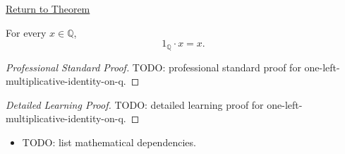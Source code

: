 \newpage
{}
\label{prf:one-left-multiplicative-identity-on-q}

\begin{remark*}[Return]
\hyperref[thm:one-left-multiplicative-identity-on-q]{Return to Theorem}
\end{remark*}

\begin{theorem*}
For every $x\in\mathbb{Q}$,
\[
1_{\mathbb{Q}}\cdot x=x.
\]
\end{theorem*}

\begin{proof}[Professional Standard Proof]
\LRAProofBodyStart
TODO: professional standard proof for one-left-multiplicative-identity-on-q.
\end{proof}

\begin{proof}[Detailed Learning Proof]
\LRAProofBodyStart
TODO: detailed learning proof for one-left-multiplicative-identity-on-q.
\end{proof}

\begin{remark*}
\end{remark*}

\begin{dependencies}
\begin{itemize}
  \item TODO: list mathematical dependencies.
\end{itemize}
\end{dependencies}

\clearpage
